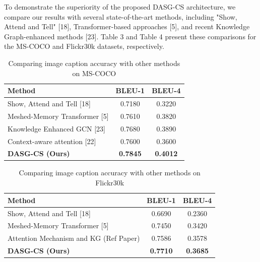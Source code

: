 \documentclass[runningheads,14pt]{llncs}
\begin{document}
To demonstrate the superiority of the proposed DASG-CS architecture, we compare our results with several state-of-the-art methods, including "Show, Attend and Tell" [18], Transformer-based approaches [5], and recent Knowledge Graph-enhanced methods [23]. Table 3 and Table 4 present these comparisons for the MS-COCO and Flickr30k datasets, respectively.

\begin{table}[h]
\centering
\caption{Comparing image caption accuracy with other methods on MS-COCO}
\label{tab:coco_compare}
\begin{tabular}{|l|c|c|}
\hline
\textbf{Method}                                & \textbf{BLEU-1} & \textbf{BLEU-4} \\ \hline
Show, Attend and Tell [18]                     & 0.7180          & 0.3220          \\ \hline
Meshed-Memory Transformer [5]                  & 0.7610          & 0.3820          \\ \hline
Knowledge Enhanced GCN [23]                    & 0.7680          & 0.3890          \\ \hline
Context-aware attention [22]                   & 0.7600          & 0.3600          \\ \hline
\textbf{DASG-CS (Ours)}                        & \textbf{0.7845} & \textbf{0.4012} \\ \hline
\end{tabular}
\end{table}

\begin{table}[h]
\centering
\caption{Comparing image caption accuracy with other methods on Flickr30k}
\label{tab:flickr_compare}
\begin{tabular}{|l|c|c|}
\hline
\textbf{Method}                                & \textbf{BLEU-1} & \textbf{BLEU-4} \\ \hline
Show, Attend and Tell [18]                     & 0.6690          & 0.2360          \\ \hline
Meshed-Memory Transformer [5]                  & 0.7450          & 0.3420          \\ \hline
Attention Mechanism and KG (Ref Paper)         & 0.7586          & 0.3578          \\ \hline
\textbf{DASG-CS (Ours)}                        & \textbf{0.7710} & \textbf{0.3685} \\ \hline
\end{tabular}
\end{table}
\end{document}
